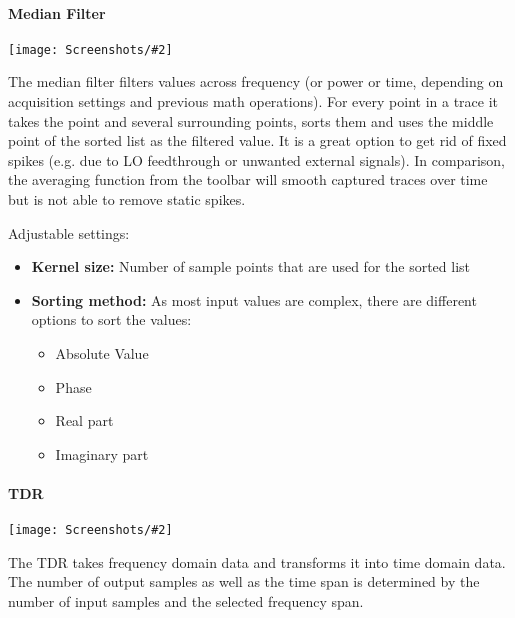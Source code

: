 \documentclass[a4paper,11pt]{article}
\newcommand{\screenshot}[2]{\begin{center}
\texttt{[image: Screenshots/\#2]}
\end{center}}
\begin{document}
\paragraph{Median Filter}
\screenshot{0.4}{MathOpMedianFilter.png}
The median filter filters values across frequency (or power or time, depending on acquisition settings and previous math operations). For every point in a trace it takes the point and several surrounding points, sorts them and uses the middle point of the sorted list as the filtered value. It is a great option to get rid of fixed spikes (e.g. due to LO feedthrough or unwanted external signals). In comparison, the averaging function from the toolbar will smooth captured traces over time but is not able to remove static spikes.

Adjustable settings:
\begin{itemize}
\item \textbf{Kernel size:} Number of sample points that are used for the sorted list
\item \textbf{Sorting method:} As most input values are complex, there are different options to sort the values:
\begin{itemize}
\item Absolute Value
\item Phase
\item Real part
\item Imaginary part
\end{itemize}
\end{itemize}
\paragraph{TDR}
\screenshot{0.4}{MathOpTDR.png}
The TDR takes frequency domain data and transforms it into time domain data. The number of output samples as well as the time span is determined by the number of input samples and the selected frequency span.
\end{document}

